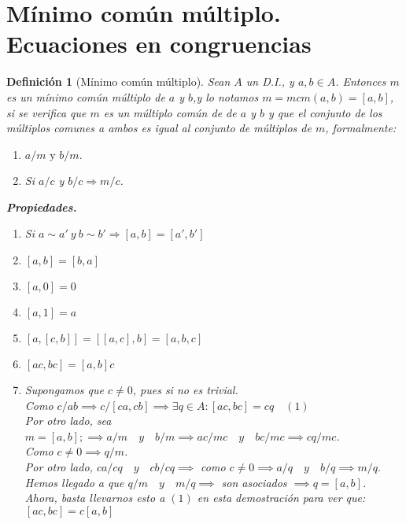 \documentclass[11pt, a4paper, titlepage]{article}
\makeatletter
\renewenvironment{proof}[1][\proofname] {\vspace{-15pt}\par\pushQED{\qed}\normalfont\topsep6\p@\@plus6\p@\relax\trivlist\item[\hskip\labelsep\it#1\@addpunct{.}]\ignorespaces}{\popQED\endtrivlist\@endpefalse}
\theoremstyle{theorem-style}
\theoremstyle{definition-style}
\newtheorem*{ndef}{Definición}
\theoremstyle{remark-style}
\theoremstyle{example-style}
\newenvironment{nlist}
{\begin{enumerate}
\renewcommand\labelenumi{(\emph{\roman{enumi})}}}
{\end{enumerate}}
\makeatother
\begin{document}
\section{Mínimo común múltiplo. Ecuaciones en congruencias}
\begin{ndef}[Mínimo común múltiplo]
	Sean $A$ un D.I., y $a, b \in A$. Entonces $m$ es un mínimo común múltiplo de $a$ y $b$,y lo notamos $m = mcm(a,b) = [a,b]$,
si se verifica que $m$ es un múltiplo común de de $a$ y $b$ y que el conjunto de los múltiplos comunes a ambos es igual al conjunto de múltiplos de $m$, formalmente: 
\begin{enumerate}
\item $a/m \text{ y } b/m$.
\item Si $a/c$ y $b/c \Rightarrow m/c$.
\end{enumerate}

\textbf{Propiedades. }
\begin{nlist}
\item Si $a\sim a' \ y \ b\sim b' \Rightarrow [a,b]=[a',b']$
\item $[a,b] = [b,a]$
\item $[a,0] = 0$
\item $[a,1] = a$
\item $[a,[c,b]]= [[a,c],b] = [a,b,c]$
\item $[ac,bc] =[a,b]c$\\

\begin{proof}[Demostración del último.]
	
	Supongamos que $c\ne 0$, pues si no es trivial.\\
	Como $c/ab\implies c/[ca,cb] \implies \exists q \in A : [ac,bc] = cq\quad (1)$\\
	Por otro lado, sea $m = [a,b]; \implies a/m \quad y \quad b/m \implies ac/mc \quad y \quad bc/mc \implies cq/mc$.\\
	Como $c\ne 0 \implies q/m$.\\
	Por otro lado, $ca/cq \quad y \quad cb/cq \implies$ como $c\ne 0 \implies a/q \quad y \quad b/q \implies m/q.$\\
	Hemos llegado a que $q/m \quad y \quad m/q \implies $ son asociados $\implies q=[a,b]$.\\
	Ahora, basta llevarnos esto a $(1)$ en esta demostración para ver que:\\ $[ac,bc] = c[a,b]$
\end{proof}
\end{nlist}
\end{ndef}
\end{document}

